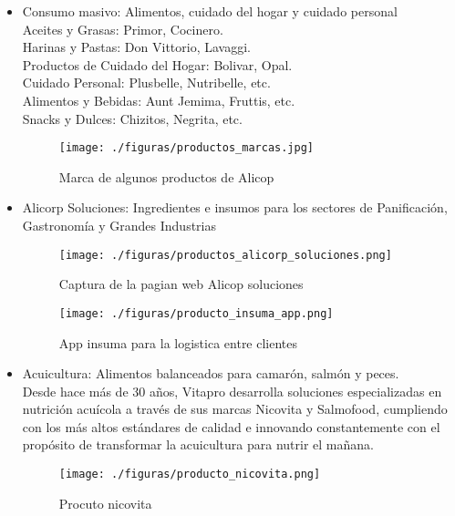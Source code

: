 \begin{itemize}
\item Consumo masivo: Alimentos, cuidado del hogar y cuidado personal
\\Aceites y Grasas: Primor, Cocinero. 
\\Harinas y Pastas: Don Vittorio, Lavaggi. 
\\Productos de Cuidado del Hogar: Bolivar, Opal. 
\\Cuidado Personal: Plusbelle, Nutribelle, etc. 
\\Alimentos y Bebidas: Aunt Jemima, Fruttis, etc. 
\\Snacks y Dulces: Chizitos, Negrita, etc. 

\begin{figure}[!ht]
    \centering
    \texttt{[image: ./figuras/productos\_marcas.jpg]}
    \caption{Marca de algunos productos de Alicop}
    \label{fig:Marcas}
\end{figure}


\item Alicorp Soluciones: Ingredientes e insumos para los sectores de Panificación, Gastronomía y Grandes Industrias\\

\begin{figure}[!ht]
    \centering
    \texttt{[image: ./figuras/productos\_alicorp\_soluciones.png]}
    \caption{Captura de la pagian web Alicop soluciones}
    \label{fig:alicorp_soluciones}
\end{figure}

\begin{figure}[!ht]
    \centering
    \texttt{[image: ./figuras/producto\_insuma\_app.png]}
    \caption{App insuma para la logistica entre clientes}
    \label{fig:insuma}
\end{figure}

\item Acuicultura: Alimentos balanceados para camarón, salmón y peces. \\
Desde hace más de 30 años, Vitapro desarrolla soluciones especializadas en nutrición acuícola a través de sus marcas Nicovita y Salmofood, cumpliendo con los más altos estándares de calidad e innovando constantemente con el propósito de transformar la acuicultura para nutrir el mañana.
\\
\begin{figure}[!ht]
    \centering
    \texttt{[image: ./figuras/producto\_nicovita.png]}
    \caption{Procuto nicovita}
    \label{fig:nicovita}
\end{figure}

\end{itemize}
